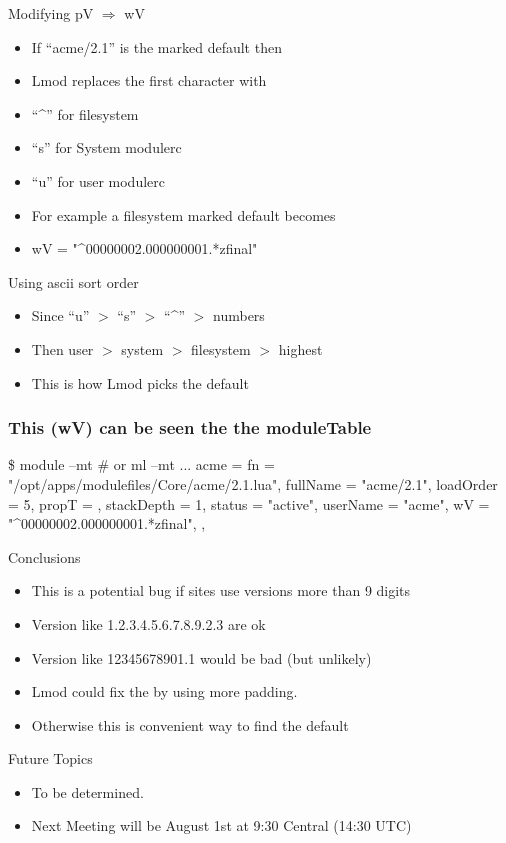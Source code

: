 \documentclass{beamer}
\begin{document}
\begin{frame}{Modifying pV $\Rightarrow$ wV}
  \begin{itemize}
    \item If ``acme/2.1'' is the marked default then 
    \item Lmod replaces the first character with 
    \item ``\^{}'' for filesystem
    \item ``s'' for System modulerc
    \item ``u'' for user modulerc
    \item For example a filesystem marked default becomes
    \item wV = "\^{}00000002.000000001.*zfinal"
  \end{itemize}
\end{frame}

\begin{frame}{Using ascii sort order}
  \begin{itemize}
    \item Since ``u'' $>$ ``s'' $>$ ``\^{}'' $>$ numbers
    \item Then user $>$ system $>$ filesystem $>$ highest
    \item This is how Lmod picks the default
  \end{itemize}
\end{frame}

\begin{frame}[fragile]
    \frametitle{This (wV) can be seen the the moduleTable}
 {\tiny
    \begin{semiverbatim}
    \$ module --mt # or ml --mt
    ...
    acme = {
      fn = "/opt/apps/modulefiles/Core/acme/2.1.lua",
      fullName = "acme/2.1",
      loadOrder = 5,
      propT = {},
      stackDepth = 1,
      status = "active",
      userName = "acme",
      wV = "^00000002.000000001.*zfinal",
    },
        
    \end{semiverbatim}
}
\end{frame}

\begin{frame}{Conclusions}
  \begin{itemize}
    \item This is a potential bug if sites use versions more than 9
      digits
    \item Version like 1.2.3.4.5.6.7.8.9.2.3 are ok
    \item Version like 12345678901.1 would be bad (but unlikely)
    \item Lmod could fix the by using more padding.
    \item Otherwise this is convenient way to find the default
  \end{itemize}
\end{frame}

\begin{frame}{Future Topics}
  \begin{itemize}
    \item To be determined.
    \item Next Meeting will be August 1st at 9:30 Central (14:30 UTC)
  \end{itemize}
\end{frame}
\end{document}
